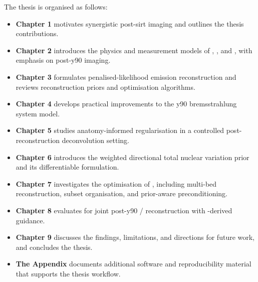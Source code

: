 The thesis is organised as follows:
\begin{itemize}
    \item \textbf{Chapter 1} motivates synergistic post-\gls{sirt} imaging and outlines the thesis contributions.
    \item \textbf{Chapter 2} introduces the physics and measurement models of , , and , with emphasis on post-\gls{y90} imaging.
    \item \textbf{Chapter 3} formulates penalised-likelihood emission reconstruction and reviews reconstruction priors and optimisation algorithms.
    \item \textbf{Chapter 4} develops practical improvements to the \gls{y90} bremsstrahlung  system model.
    \item \textbf{Chapter 5} studies anatomy-informed regularisation in a controlled post-reconstruction deconvolution setting.
    \item \textbf{Chapter 6} introduces the weighted directional total nuclear variation prior and its differentiable formulation.
    \item \textbf{Chapter 7} investigates the optimisation of , including multi-bed  reconstruction, subset organisation, and prior-aware preconditioning.
    \item \textbf{Chapter 8} evaluates  for joint post-\gls{y90} / reconstruction with -derived guidance.
    \item \textbf{Chapter 9} discusses the findings, limitations, and directions for future work, and concludes the thesis.
    \item \textbf{The Appendix} documents additional software and reproducibility material that supports the thesis workflow.
\end{itemize}
